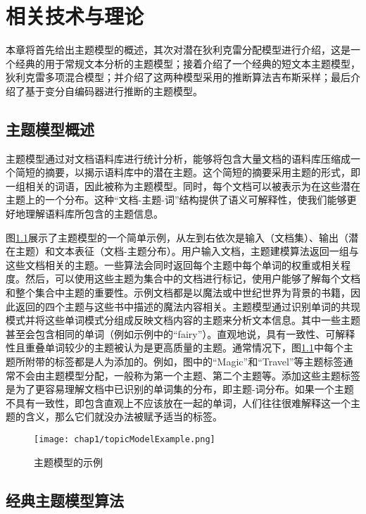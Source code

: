 \chapter{相关技术与理论}\label{chap:preliminary}
本章将首先给出主题模型的概述，其次对潜在狄利克雷分配模型进行介绍，这是一个经典的用于常规文本分析的主题模型；接着介绍了一个经典的短文本主题模型，狄利克雷多项混合模型；并介绍了这两种模型采用的推断算法吉布斯采样；最后介绍了基于变分自编码器进行推断的主题模型。

\section{主题模型概述}
主题模型通过对文档语料库进行统计分析，能够将包含大量文档的语料库压缩成一个简短的摘要，以揭示语料库中的潜在主题。这个简短的摘要采用主题的形式，即一组相关的词语，因此被称为主题模型。同时，每个文档可以被表示为在这些潜在主题上的一个分布。这种“文档-主题-词”结构提供了语义可解释性，使我们能够更好地理解语料库所包含的主题信息。

图\ref{Chp1_1}\cite{survey_2023}展示了主题模型的一个简单示例，从左到右依次是输入（文档集）、输出（潜在主题）和文本表征（文档-主题分布）。用户输入文档，主题建模算法返回一组与这些文档相关的主题。一些算法会同时返回每个主题中每个单词的权重或相关程度。然后，可以使用这些主题为集合中的文档进行标记，使用户能够了解每个文档和整个集合中主题的重要性。示例文档都是以魔法或中世纪世界为背景的书籍，因此返回的四个主题与这些书中描述的魔法内容相关。主题模型通过识别单词的共现模式并将这些单词模式分组成反映文档内容的主题来分析文本信息。其中一些主题甚至会包含相同的单词（例如示例中的“fairy”）。直观地说，具有一致性、可解释性且重叠单词较少的主题被认为是更高质量的主题。通常情况下，图\ref{Chp1_1}中每个主题所附带的标签都是人为添加的。例如，图中的“Magic”和“Travel”等主题标签通常不会由主题模型分配，一般称为第一个主题、第二个主题等。添加这些主题标签是为了更容易理解文档中已识别的单词集的分布，即主题-词分布。如果一个主题不具有一致性，即包含直观上不应该放在一起的单词，人们往往很难解释这一个主题的含义，那么它们就没办法被赋予适当的标签。

\begin{figure}[!htbp]
    \centering
    \texttt{[image: chap1/topicModelExample.png]}
    \caption{主题模型的示例} 
    \label{Chp1_1}
\end{figure}

\section{经典主题模型算法}
